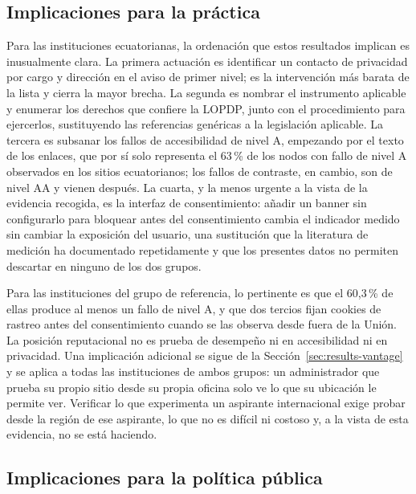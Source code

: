 \documentclass[pdflatex,sn-basic,Numbered,iicol]{sn-jnl}
\theoremstyle{thmstyleone}
\theoremstyle{thmstyletwo}
\theoremstyle{thmstylethree}
\begin{document}
\subsection{Implicaciones para la pr\'actica}\label{sec:discussion-practice}

Para las instituciones ecuatorianas, la ordenaci\'on que estos resultados implican es inusualmente clara. La primera actuaci\'on es identificar un contacto de privacidad por cargo y direcci\'on en el aviso de primer nivel; es la intervenci\'on m\'as barata de la lista y cierra la mayor brecha. La segunda es nombrar el instrumento aplicable y enumerar los derechos que confiere la LOPDP, junto con el procedimiento para ejercerlos, sustituyendo las referencias gen\'ericas a \guillemotleft la legislaci\'on aplicable\guillemotright. La tercera es subsanar los fallos de accesibilidad de nivel A, empezando por el texto de los enlaces, que por s\'i solo representa el 63\,\% de los nodos con fallo de nivel A observados en los sitios ecuatorianos; los fallos de contraste, en cambio, son de nivel AA y vienen despu\'es. La cuarta, y la menos urgente a la vista de la evidencia recogida, es la interfaz de consentimiento: a\~nadir un banner sin configurarlo para bloquear antes del consentimiento cambia el indicador medido sin cambiar la exposici\'on del usuario, una sustituci\'on que la literatura de medici\'on ha documentado repetidamente \citep{sanchezrola2019can,bollinger2022automating} y que los presentes datos no permiten descartar en ninguno de los dos grupos.

Para las instituciones del grupo de referencia, lo pertinente es que el 60,3\,\% de ellas produce al menos un fallo de nivel A, y que dos tercios fijan cookies de rastreo antes del consentimiento cuando se las observa desde fuera de la Uni\'on. La posici\'on reputacional no es prueba de desempe\~no ni en accesibilidad ni en privacidad. Una implicaci\'on adicional se sigue de la Secci\'on~\ref{sec:results-vantage} y se aplica a todas las instituciones de ambos grupos: un administrador que prueba su propio sitio desde su propia oficina solo ve lo que su ubicaci\'on le permite ver. Verificar lo que experimenta un aspirante internacional exige probar desde la regi\'on de ese aspirante, lo que no es dif\'icil ni costoso y, a la vista de esta evidencia, no se est\'a haciendo.

\subsection{Implicaciones para la pol\'itica p\'ublica}\label{sec:discussion-policy}
\end{document}

